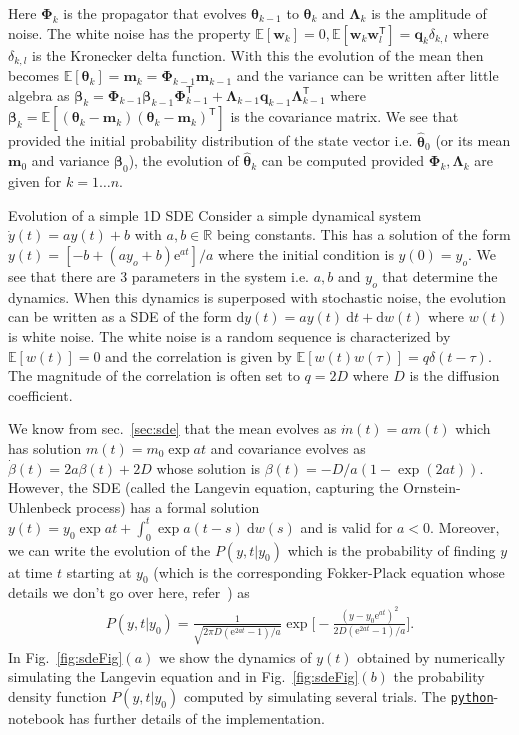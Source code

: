 \documentclass{resonance}
\def\e{\text{e}}
\def\R{\mathbb{R}}
\def\d{\text{d}}
\def\E{\mathbb{E}}
\def\x{\bm{\theta}}
\def\thh{\bm{\hat{\theta}}}
\def\w{\mathbf{w}}
\def\q{\mathbf{q}}
\def\m{\bm{m}}
\def\p{\bm{\beta}}
\def\T{\mathsf{T}}
\def\E{\mathbb{E}}
\def\PhiB{\boldsymbol{\Phi}}
\def\LambdaB{\boldsymbol{\Lambda}}
\begin{document}
Here $\PhiB_k$ is the propagator that evolves $\x_{k-1}$ to $\x_k$ and $\LambdaB_{k}$ is the amplitude of noise. The white noise has the property $\E[\w_k] = 0, \E[\w_k \w_l^\T] = \q_k \delta_{k,l}$ where $\delta_{k,l}$ is the Kronecker delta function. With this the evolution of the mean then becomes $\E[\x_k] = \m_k = \PhiB_{k-1} \m_{k-1}$ and the variance can be written after little algebra as $\p_k = \PhiB_{k-1} \p_{k-1} \PhiB_{k-1}^\T + \LambdaB_{k-1}\q_{k-1}\LambdaB^\T_{k-1}$ where $\p_k = \E[(\x_k-\m_k)(\x_k-\m_k)^\T]$ is the covariance matrix. We see that provided the initial probability distribution of the state vector i.e. $\thh_0$ (or its mean $\m_0$ and variance $\p_0$), the evolution of $\thh_k$ can be computed provided $\PhiB_k,  \LambdaB_k$ are given for $k=1 \dots n$.

\begin{egsBox}[label={egs:sde}]{Evolution of a simple 1D SDE}
\footnotesize
Consider a simple dynamical system $\dot{y}(t) = a y(t) + b$ with $a, b \in \R$ being constants. This has a solution of the form $y(t) = [-b + (a y_o + b) \e^{a t}]/a$ where the initial condition is $y(0) = y_o$. We see that there are 3 parameters in the system i.e. $a, b$ and $y_o$ that determine the dynamics. When this dynamics is superposed with stochastic noise, the evolution can be written as a SDE of the form $\d y(t) = a y(t) \ \d t + \d w(t)$ where $w(t)$ is white noise. The white noise is a random sequence is characterized by $\E [w(t)] = 0$ and the correlation is given by $\E[w(t)w(\tau)] = q \delta(t-\tau)$. The magnitude of the correlation is often set to $q=2D$ where $D$ is the diffusion coefficient.

We know from sec.~\ref{sec:sde} that the mean evolves as $\dot{m}(t) = a m(t)$ which has solution $m(t) = m_0 \exp{a t}$ and covariance evolves as $\dot{\beta}(t) = 2 a \beta(t) + 2D$ whose solution is $\beta(t) = -D/a( 1 - \exp{(2at)} )$. However, the SDE (called the Langevin equation, capturing the Ornstein-Uhlenbeck process) has a formal solution $y(t) = y_0 \exp{a t} + \int_0^t \exp{a(t-s)}\ \d w(s) $ and is valid for $a < 0$. Moreover, we can write the evolution of the $P(y,t|y_0)$ which is the probability of finding $y$ at time $t$ starting at $y_0$ (which is the corresponding Fokker-Plack equation whose details we don't go over here, refer~\cite{chandrasekhar1943stochastic, balakrishnan2008elements}) as
\begin{align*}
    P(y,t|y_0) = \frac{1}{\sqrt{2 \pi D (\e^{2 a t} - 1)/a}} \exp \bigg[- \frac{(y-y_0\e^{at})^2}{2D(\e^{2 a t} - 1)/a} \bigg].
\end{align*}
In Fig.~\ref{fig:sdeFig}$(a)$ we show the dynamics of $y(t)$ obtained by numerically simulating the Langevin equation and in Fig.~\ref{fig:sdeFig}$(b)$ the probability density function $P(y,t|y_0)$ computed by simulating several trials. The \href{https://github.com/sgangaprasath/KFTutorial/blob/main/KFTutorial.ipynb}{\texttt{python}}-notebook has further details of the implementation.
\end{egsBox}
\end{document}
